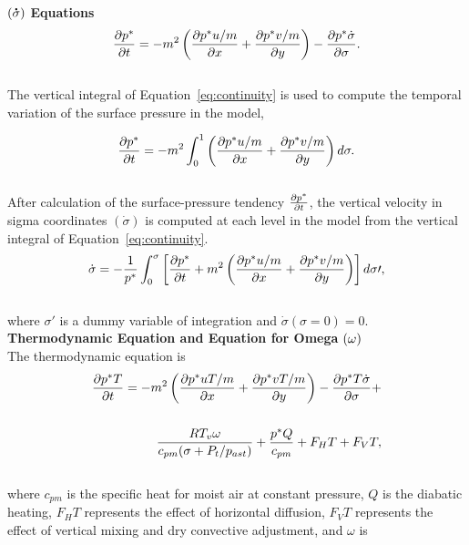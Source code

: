  $({\bf \dot{\sigma}})$ {\bf  Equations}
\begin{eqnarray} \label{eq:continuity} {{\partial{p^{\ast}} \over \partial{t}}}
= -m^2 \left( {\partial{p^{\ast}u/m} \over \partial{x}} + {\partial{p^{\ast}v/m}
\over \partial{y}} \right) - {\partial{p^{\ast}\dot{\sigma}} \over
\partial{\sigma}}.  \end{eqnarray} \\ \noindent The vertical integral of
Equation~\ref{eq:continuity} is used to compute the temporal variation of the
surface pressure in the model,

\begin{eqnarray} {{\partial{p^{\ast}} \over \partial{t}}} = -m^2 \int_{0}^{1}
\left( {\partial{p^{\ast}u/m} \over \partial{x}} + {\partial{p^{\ast}v/m} \over
\partial{y}} \right) d\sigma.  \end{eqnarray} \\ \noindent After calculation of
the surface-pressure tendency ${\partial{p^{\ast}} \over \partial{t}}$, the
vertical velocity in sigma coordinates $(\dot{\sigma})$ is computed at each
level in the model from the vertical integral of Equation~\ref{eq:continuity}.
\begin{eqnarray} \dot{\sigma} = - {1 \over p^{\ast}} \int_{0}^{\sigma} \left[
{\partial{p^{\ast}} \over \partial{t}} + m^2 \left( {\partial{p^{\ast}u/m} \over
\partial{x}} + {\partial{p^{\ast}v/m} \over \partial{y}} \right) \right]
d\sigma\prime, \end{eqnarray} \\ \noindent where $\sigma\prime$ is a dummy
variable of integration and $\dot{\sigma}(\sigma=0)=0$.  \\ \newpage \noindent
{\bf Thermodynamic Equation and Equation for Omega} ${\bf (\omega)}$ \\
\noindent The thermodynamic equation is \begin{eqnarray} \nonumber
{{\partial{p^{\ast}T} \over \partial{t}}} = -m^2 \left( {\partial{p^{\ast}uT/m}
\over \partial{x}} + {\partial{p^{\ast}vT/m} \over \partial{y}} \right) -
{\partial{p^{\ast}T\dot{\sigma}} \over \partial{\sigma}} +  \\ \nonumber \\
{RT_v\omega \over c_{pm}(\sigma + P_t/p_{ast})} + {p^{\ast}Q \over c_{pm}} +
F_HT + F_VT, \end{eqnarray} \\ \noindent where $c_{pm}$ is the specific heat for
moist air at constant pressure, $Q$ is the diabatic heating, $F_HT$ represents
the effect of horizontal diffusion, $F_VT$ represents the effect of vertical
mixing and dry convective adjustment, and $\omega$ is

